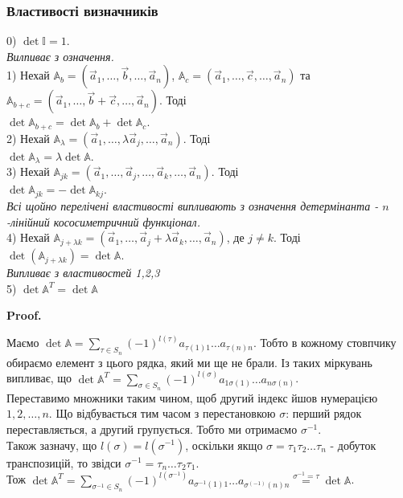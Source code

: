\documentclass[a4paper, 10pt]{article}
\makeatletter
\theoremstyle{theoremdd}
\renewenvironment{proof}[1][Proof.\\]{\par
\pushQED{\hfill \qed}%
\normalfont \topsep6\p@\@plus6\p@\relax
\trivlist
\item\relax
{\bfseries
#1\@addpunct{.}}\hspace\labelsep\ignorespaces
}{%
\popQED\endtrivlist\@endpefalse
}
\makeatother
\begin{document}
\subsubsection*{Властивості визначників}
0) $\det \mathbb{I} = 1$.\\
\textit{Вилпиває з означення.}
\bigskip \\
1) Нехай $\mathbb{A}_b = (\vec{a}_1, \dots, \vec{b}, \dots, \vec{a}_n)$, $\mathbb{A}_c = (\vec{a}_1, \dots, \vec{c}, \dots, \vec{a}_n)$ та $\mathbb{A}_{b+c} = (\vec{a}_1, \dots, \vec{b}+\vec{c}, \dots, \vec{a}_n)$. Тоді\\
$\det \mathbb{A}_{b+c} = \det \mathbb{A}_b + \det \mathbb{A}_{c}$.
\bigskip \\
2) Нехай $\mathbb{A}_{\lambda} = (\vec{a}_1, \dots, \lambda \vec{a}_j, \dots, \vec{a}_n)$. Тоді\\
$\det \mathbb{A}_{\lambda} = \lambda \det \mathbb{A}$.
\bigskip \\
3) Нехай $\mathbb{A}_{jk} = (\vec{a}_1, \dots, \vec{a}_j, \dots, \vec{a}_k, \dots, \vec{a}_n)$. Тоді \\
$\det \mathbb{A}_{jk} = - \det \mathbb{A}_{kj}$.\\
\textit{Всі щойно перелічені властивості випливають з означення детермінанта - $n$-лінійний кососиметричний функціонал.}
\bigskip \\
4) Нехай $\mathbb{A}_{j + \lambda k} = (\vec{a}_1,\dots, \vec{a}_j + \lambda \vec{a}_k, \dots, \vec{a}_n)$, де $j \neq k$. Тоді\\
$\det (\mathbb{A}_{j + \lambda k}) = \det \mathbb{A}$.\\
\textit{Випливає з властивостей 1,2,3}
\bigskip \\
5) $\det \mathbb{A}^T = \det \mathbb{A}$
\begin{proof}
Маємо $\det \mathbb{A} = \displaystyle\sum_{\tau \in S_n} (-1)^{l(\tau)}a_{\tau(1)1}\dots a_{\tau(n)n}$. Тобто в кожному стовпчику обираємо елемент з цього рядка, який ми ще не брали. Із таких міркувань випливає, що $\det \mathbb{A}^T = \displaystyle\sum_{\sigma \in S_n} (-1)^{l(\sigma)}a_{1 \sigma(1)}\dots a_{n \sigma(n)}$.\\
Переставимо множники таким чином, щоб другий індекс йшов нумерацією $1,2,\dots,n$. Що відбувається тим часом з перестановкою $\sigma$: перший рядок переставляється, а другий групується. Тобто ми отримаємо $\sigma^{-1}$.\\
Також зазначу, що $l(\sigma) = l(\sigma^{-1})$, оскільки якщо $\sigma = \tau_1 \tau_2 \dots \tau_n$ - добуток транспозицій, то звідси $\sigma^{-1} = \tau_n \dots \tau_2 \tau_1$.\\
Тож $\det \mathbb{A}^T = \displaystyle\sum_{\sigma^{-1} \in S_n} (-1)^{l(\sigma^{-1})} a_{\sigma^{-1}(1)1}\dots a_{\sigma^{(-1)}(n)n} \overset{\sigma^{-1} = \tau}{=} \det \mathbb{A}$.
\end{proof}
\end{document}
